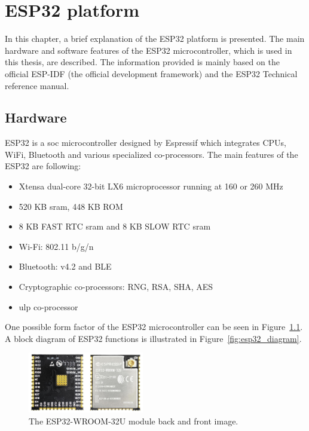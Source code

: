 \chapter{ESP32 platform}

In this chapter, a brief explanation of the ESP32 platform is presented. The main hardware and software features of the ESP32 microcontroller, which is used in this thesis, are described. The information provided is mainly based on the official ESP-IDF (the official development framework)\cite{espidf2022} and the ESP32 Technical reference manual\cite{esp322021}.

\section{Hardware}

ESP32 is a \gls{soc} microcontroller designed by Espressif which integrates CPUs, WiFi, Bluetooth and various specialized co-processors. The main features of the ESP32 are following:

\begin{itemize}
    \item Xtensa dual-core 32-bit LX6 microprocessor running at 160 or 260 MHz
    \item 520 KB \gls{sram}, 448 KB ROM
    \item 8 KB FAST RTC \gls{sram} and 8 KB SLOW RTC \gls{sram}
    \item Wi-Fi: 802.11 b/g/n
    \item Bluetooth: v4.2 and BLE
    \item Cryptographic co-processors: RNG, RSA, SHA, AES
    \item \Gls{ulp} co-processor
\end{itemize}

One possible form factor of the ESP32 microcontroller can be seen in Figure~\ref{fig:esp32_wroom_module}. A block diagram of ESP32 functions is illustrated in Figure~\ref{fig:esp32_diagram}.

\begin{figure}[hb!]
    \centering
    \captionsetup{justification=centering,margin=0.5cm}
    \includegraphics[width=0.45\textwidth]{images/esp32_wroom_module.jpg}
    \caption[The ESP32-WROOM-32U module back and front image.]{The ESP32-WROOM-32U module back and front image.\cite{SOSelectronic2018}}
    \label{fig:esp32_wroom_module}
\end{figure}

